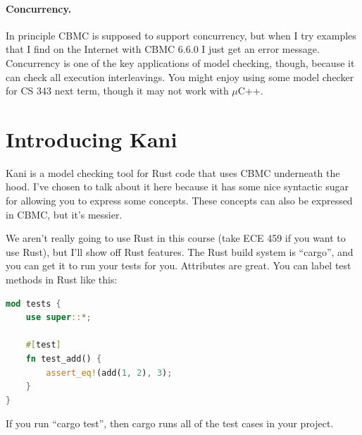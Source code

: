 \documentclass[11pt]{article}
\begin{document}
\paragraph{Concurrency.}
In principle CBMC is supposed to support concurrency, but when I try examples that I find on the Internet with CBMC 6.6.0
I just get an error message. Concurrency is one of the key applications of model checking, though, because
it can check all execution interleavings. You might enjoy using some model checker for CS 343 next term, though
it may not work with $\mu$C++.


\section*{Introducing Kani}
Kani is a model checking tool for Rust code that uses CBMC underneath the hood. I've chosen to talk about it
here because it has some nice syntactic sugar for allowing you to express some concepts. These concepts can
also be expressed in CBMC, but it's messier.

We aren't really going to use Rust in this course (take ECE 459 if you want to use Rust), but I'll show
off Rust features. The Rust build system is ``cargo'', and you can get it to run your tests for you.
Attributes are great. You can label test methods in Rust like this:
\begin{lstlisting}[language=Rust]
mod tests {
    use super::*;

    #[test]
    fn test_add() {
        assert_eq!(add(1, 2), 3);
    }
}
\end{lstlisting}
If you run ``cargo test'', then cargo runs all of the test cases in your project.
\end{document}
